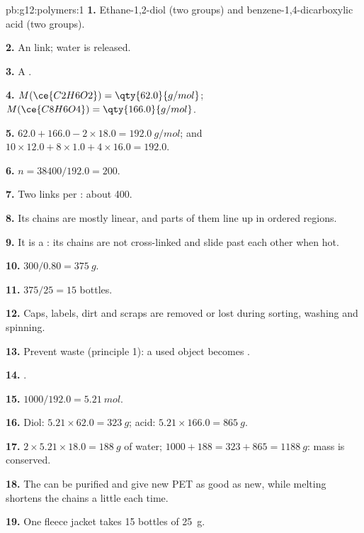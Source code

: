 \begin{solution}{pb:g12:polymers:1}
\textbf{1.} Ethane-1,2-diol (two  groups) and
benzene-1,4-dicarboxylic acid (two  groups).

\textbf{2.} An  link; water is released.

\textbf{3.} A .

\textbf{4.} $M(\ce{C2H6O2}) = \qty{62.0}{g/mol}$; $M(\ce{C8H6O4}) =
\qty{166.0}{g/mol}$.

\textbf{5.} $62.0 + 166.0 - 2 \times 18.0 = \qty{192.0}{g/mol}$; and
$10 \times 12.0 + 8 \times 1.0 + 4 \times 16.0 = 192.0$.

\textbf{6.} $n = 38400/192.0 = 200$.

\textbf{7.} Two  links per : about 400.

\textbf{8.} Its chains are mostly linear, and parts of them line up in
ordered regions.

\textbf{9.} It is a : its chains are not cross-linked and
slide past each other when hot.

\textbf{10.} $300/0.80 = \qty{375}{g}$.

\textbf{11.} $375/25 = 15$ bottles.

\textbf{12.} Caps, labels, dirt and scraps are removed or lost during
sorting, washing and spinning.

\textbf{13.} Prevent waste (principle 1): a used object becomes .

\textbf{14.} .

\textbf{15.} $1000/192.0 = \qty{5.21}{mol}$.

\textbf{16.} Diol: $5.21 \times 62.0 = \qty{323}{g}$; acid:
$5.21 \times 166.0 = \qty{865}{g}$.

\textbf{17.} $2 \times 5.21 \times 18.0 = \qty{188}{g}$ of water;
$1000 + 188 = 323 + 865 = \qty{1188}{g}$: mass is conserved.

\textbf{18.} The  can be purified and give new PET as good as
new, while melting shortens the chains a little each time.

\textbf{19.} One fleece jacket takes 15 bottles of \qty{25}{g}.
\end{solution}
